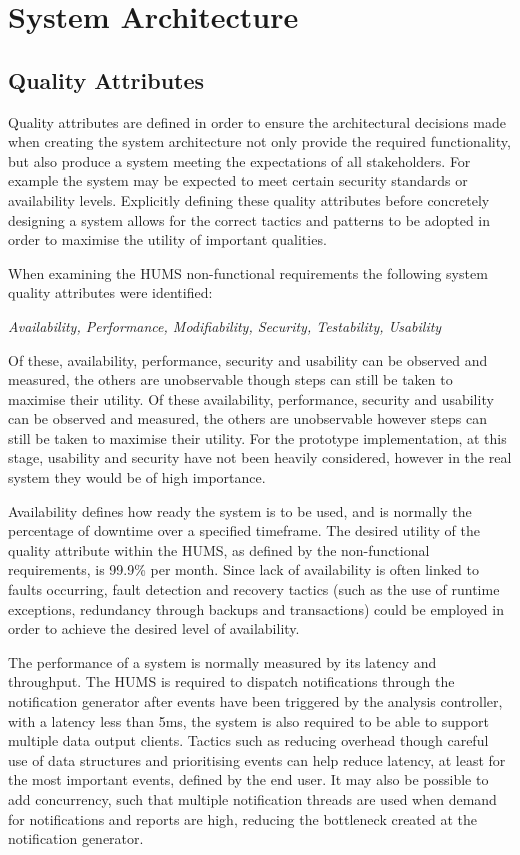 \section{System Architecture}
\label{sec:architecture}

\subsection{Quality Attributes}
\label{sec:architecture-quality}

Quality attributes are defined in order to ensure the architectural decisions made when creating the system architecture not only provide the required functionality, but also produce a system meeting the expectations of all stakeholders. For example the system may be expected to meet certain security standards or availability levels. Explicitly defining these quality attributes before concretely designing a system allows for the correct tactics and patterns to be adopted in order to maximise the utility of important 
qualities.

When examining the HUMS non-functional requirements the following system quality attributes were identified:
	\begin{center}
	\textit{
		Availability, Performance, Modifiability, Security, Testability, Usability}
	\end{center}
Of these, availability, performance, security and usability can be observed and measured, the others are unobservable though steps can still be taken to maximise their utility.
Of these availability, performance, security and usability can be observed and measured, the others are unobservable however steps can still be taken to maximise their utility. For the prototype implementation, at this stage, usability and security have not been heavily considered, however in the real system they would be of high importance.

Availability defines how ready the system is to be used, and is normally the percentage of downtime over a specified timeframe. The desired utility of the quality attribute within the HUMS, as defined by the non-functional requirements, is  99.9\% per month. Since lack of availability is often linked to faults occurring, fault detection and recovery tactics (such as the use of runtime exceptions, redundancy through backups and transactions) could be employed in order to achieve the desired level of availability. 

The performance of a system is normally measured by its latency and throughput. The HUMS is required to dispatch notifications through the notification generator after events have been triggered by the analysis controller, with a latency less than 5ms, the system is 
also required to be able to support multiple data output clients. Tactics such as reducing overhead though careful use of data structures and prioritising events can help reduce latency, at least for the most important events, defined by the end user. It may also be possible to add concurrency, such that multiple notification threads are used when demand for notifications and reports are high, reducing the bottleneck created at the notification generator.

